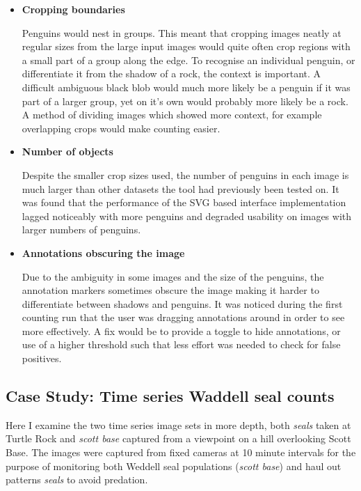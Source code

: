 \begin{itemize}
    \item {\textbf{Cropping boundaries}}\par
Penguins would nest in groups. This meant that cropping images neatly at regular sizes from the large input images would quite often crop regions with a small part of a group along the edge. To recognise an individual penguin, or differentiate it from the shadow of a rock, the context is important. A difficult ambiguous black blob would much more likely be a penguin if it was part of a larger group, yet on it's own would probably more likely be a rock. A method of dividing images which showed more context, for example overlapping crops would make counting easier.
    \item {\textbf{Number of objects}}\par
Despite the smaller crop sizes used, the number of penguins in each image is much larger than other datasets the tool had previously been tested on. It was found that the performance of the \gls{SVG} based interface implementation lagged noticeably with more penguins and degraded usability on images with larger numbers of penguins. 
    \item {\textbf{Annotations obscuring the image}}\par
Due to the ambiguity in some images and the size of the penguins,  the annotation markers sometimes obscure the image making it harder to differentiate between shadows and penguins. It was noticed during the first counting run that the user was dragging annotations around in order to see more effectively. A fix would be to provide a toggle to hide annotations, or use of a higher threshold such that less effort was needed to check for false positives.

\end{itemize}


\subsection{Case Study: Time series Waddell seal counts}
\label{sec:case_seals}

Here I examine the two time series image sets in more depth, both \emph{seals} taken at Turtle Rock and \emph{scott base} captured from a viewpoint on a hill overlooking Scott Base. The images were captured from fixed cameras at 10 minute intervals for the purpose of monitoring both Weddell seal populations (\emph{scott base}) and haul out patterns \emph{seals} to avoid predation. 


